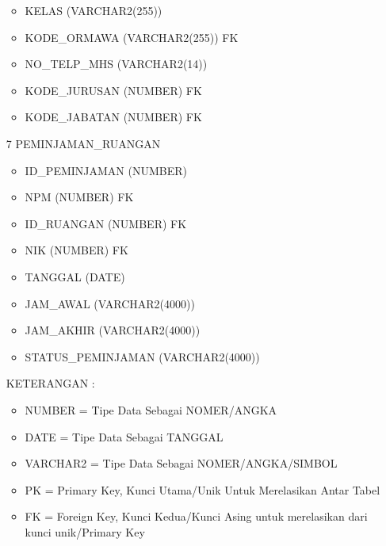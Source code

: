 \begin{itemize}
\begin{itemize}
                \item KELAS (VARCHAR2(255))
                \item KODE\_ORMAWA (VARCHAR2(255)) FK
                \item NO\_TELP\_MHS (VARCHAR2(14))
                \item KODE\_JURUSAN (NUMBER) FK
                \item KODE\_JABATAN (NUMBER) FK
            \end{itemize}
    \item[7]PEMINJAMAN\_RUANGAN
            \begin{itemize}
                \item ID\_PEMINJAMAN (NUMBER)
                \item NPM (NUMBER) FK
                \item ID\_RUANGAN (NUMBER) FK
                \item NIK (NUMBER) FK
                \item TANGGAL (DATE)
                \item JAM\_AWAL (VARCHAR2(4000))
                \item JAM\_AKHIR (VARCHAR2(4000))
                \item STATUS\_PEMINJAMAN (VARCHAR2(4000))
            \end{itemize}
    \par KETERANGAN :
            \begin{itemize}
                \item NUMBER = Tipe Data Sebagai NOMER/ANGKA
                \item DATE = Tipe Data Sebagai TANGGAL
                \item VARCHAR2 = Tipe Data Sebagai NOMER/ANGKA/SIMBOL
                \item PK = Primary Key, Kunci Utama/Unik Untuk Merelasikan Antar Tabel
                \item FK = Foreign Key, Kunci Kedua/Kunci Asing untuk merelasikan dari kunci unik/Primary Key
            \end{itemize}
    

\end{itemize}

